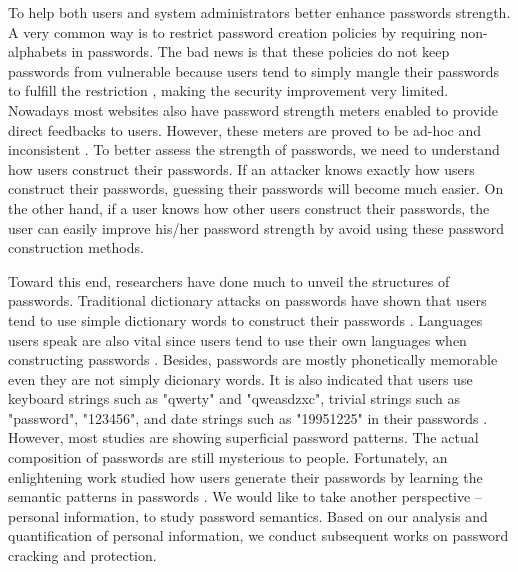 \documentclass{sig-alternate}
\begin{document}
To help both users and system administrators better enhance passwords strength. A very common way is to restrict password creation policies by requiring non-alphabets in passwords. The bad news is that these policies do not keep passwords from vulnerable because users tend to simply mangle their passwords to fulfill the restriction \cite{weir2010testing}, making the security improvement very limited. Nowadays most websites also have password strength meters enabled to provide direct feedbacks to users. However, these meters are proved to be ad-hoc and inconsistent \cite{de2014very}. To better assess the strength of passwords, we need to understand how users construct their passwords. If an attacker knows exactly how users construct their passwords, guessing their passwords will become much easier. On the other hand, if a user knows how other users construct their passwords, the user can easily improve his/her password strength by avoid using these password construction methods. 

Toward this end, researchers have done much to unveil the structures of passwords. Traditional dictionary attacks on passwords have shown that users tend to use simple dictionary words to construct their passwords \cite{hellman1980cryptanalytic}\cite{morris1979password}. Languages users speak are also vital since users tend to use their own languages when constructing passwords \cite{bonneau2012science}. Besides, passwords are mostly phonetically memorable \cite{narayanan2005fast} even they are not simply dicionary words. It is also indicated that users use keyboard strings such as "qwerty" and "qweasdzxc", trivial strings such as "password", "123456", and date strings such as "19951225" in their passwords \cite{li2014large}\cite{schweitzer2009visualizing}\cite{veras2012visualizing}. However, most studies are showing superficial password patterns. The actual composition of passwords are still mysterious to people. Fortunately, an enlightening work studied how users generate their passwords by learning the semantic patterns in passwords \cite{veras2014semantic}. We would like to take another perspective -- personal information, to study password semantics. Based on our analysis and quantification of personal information, we conduct subsequent works on password cracking and protection. 
\end{document}
